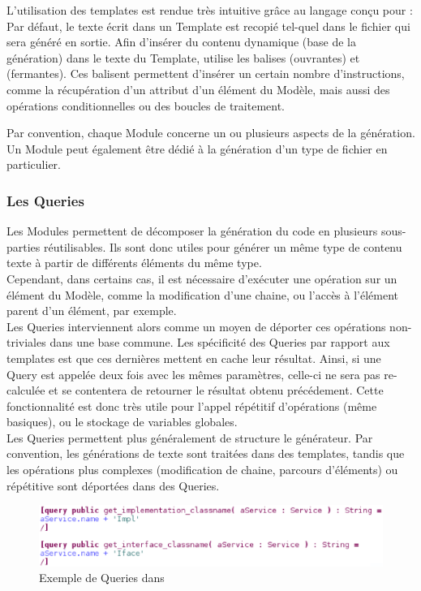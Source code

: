 L'utilisation des templates est rendue très intuitive grâce au langage conçu pour \kwacceleo{} : Par défaut, le texte écrit dans un Template est recopié tel-quel dans le fichier qui sera généré en sortie. Afin d'insérer du contenu dynamique (base de la génération) dans le texte du Template, \kwacceleo{} utilise les balises \guim{\textbf{[}} (ouvrantes) et \guim{\textbf{/]}} (fermantes). Ces balisent permettent d'insérer un certain nombre d'instructions, comme la récupération d'un attribut d'un élément du Modèle, mais aussi des opérations conditionnelles ou des boucles de traitement.

Par convention, chaque Module concerne un ou plusieurs aspects de la génération. Un Module peut également être dédié à la génération d'un type de fichier en particulier.



\subsubsection{Les Queries}

Les Modules permettent de décomposer la génération du code en plusieurs sous-parties réutilisables. Ils sont donc utiles pour générer un même type de contenu texte à partir de différents éléments du même type.\\
Cependant, dans certains cas, il est nécessaire d'exécuter une opération sur un élément du Modèle, comme la modification d'une chaine, ou l'accès à l'élément parent d'un élément, par exemple.\\
Les Queries interviennent alors comme un moyen de déporter ces opérations non-triviales dans une base commune. Les spécificité des Queries par rapport aux templates est que ces dernières mettent en cache leur résultat. Ainsi, si une Query est appelée deux fois avec les mêmes paramètres, celle-ci ne sera pas re-calculée et se contentera de retourner le résultat obtenu précédement. Cette fonctionnalité est donc très utile pour l'appel répétitif d'opérations (même basiques), ou le stockage de variables globales.\\
Les Queries permettent plus généralement de structure le générateur. Par convention, les générations de texte sont traitées dans des templates, tandis que les opérations plus complexes (modification de chaine, parcours d'éléments) ou répétitive sont déportées dans des Queries.

\begin{figure}[htb]
  \centering
  \includegraphics[scale=0.6]{img/screen_query.eps}
  \caption{Exemple de Queries dans \kwacceleo{}}
  \label{fig:acc_module}
\end{figure}

